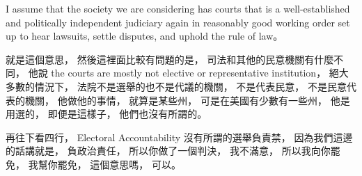 \hypertarget{w06:cue:1537}{}I assume that the society we are considering has courts
\hypertarget{w06:cue:1538}{}that is a well-established and politically independent judiciary
\hypertarget{w06:cue:1539}{}again in reasonably good working order
\hypertarget{w06:cue:1540}{}set up to hear lawsuits, settle disputes, and uphold the rule of law。

\hypertarget{w06:cue:1541}{}就是這個意思，
\hypertarget{w06:cue:1542}{}然後這裡面比較有問題的是，
\hypertarget{w06:cue:1543}{}司法和其他的民意機關有什麼不同，
\hypertarget{w06:cue:1544}{}他說 the courts are mostly not elective or representative institution，
\hypertarget{w06:cue:1545}{}絕大多數的情況下，
\hypertarget{w06:cue:1546}{}法院不是選舉的也不是代議的機關，
\hypertarget{w06:cue:1547}{}不是代表民意，
\hypertarget{w06:cue:1548}{}不是民意代表的機關，
\hypertarget{w06:cue:1549}{}他做他的事情，
\hypertarget{w06:cue:1550}{}就算是某些州，
\hypertarget{w06:cue:1551}{}可是在美國有少數有一些州，
\hypertarget{w06:cue:1552}{}他是用選的，
\hypertarget{w06:cue:1553}{}即便是這樣子，
\hypertarget{w06:cue:1554}{}他們也沒有所謂的。

\hypertarget{w06:cue:1555}{}再往下看四行，
\hypertarget{w06:cue:1556}{}Electoral Accountability
\hypertarget{w06:cue:1557}{}沒有所謂的選舉負責禁，
\hypertarget{w06:cue:1558}{}因為我們這邊的話講就是，
\hypertarget{w06:cue:1559}{}負政治責任，
\hypertarget{w06:cue:1560}{}所以你做了一個判決，
\hypertarget{w06:cue:1561}{}我不滿意，
\hypertarget{w06:cue:1562}{}所以我向你罷免，
\hypertarget{w06:cue:1563}{}我幫你罷免，
\hypertarget{w06:cue:1564}{}這個意思嗎，
\hypertarget{w06:cue:1565}{}可以。

